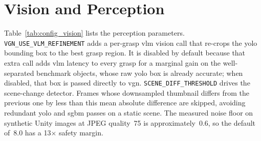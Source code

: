 \section{Vision and Perception}\label{appendix:config:vision}
Table~\ref{tab:config_vision} lists the perception parameters. \texttt{VGN\_USE\_VLM\_REFINEMENT} adds a per-grasp \gls{vlm} vision call that re-crops the \gls{yolo} bounding box to the best grasp region. It is disabled by default because that extra call adds \gls{vlm} latency to every grasp for a marginal gain on the well-separated benchmark objects, whose raw \gls{yolo} box is already accurate; when disabled, that box is passed directly to \gls{vgn}. \texttt{SCENE\_DIFF\_THRESHOLD} drives the scene-change detector. Frames whose downsampled thumbnail differs from the previous one by less than this mean absolute difference are skipped, avoiding redundant \gls{yolo} and \gls{sgbm} passes on a static scene. The measured noise floor on synthetic Unity images at JPEG quality~75 is approximately~0.6, so the default of~8.0 has a 13$\times$ safety margin.

